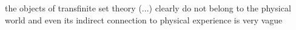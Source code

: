 \documentclass[preview]{standalone}
\begin{document}
\begin{center}
the objects of transfinite set theory (...) clearly do not belong to the physical world and even its indirect connection to physical experience is very vague
\end{center}
\end{document}
